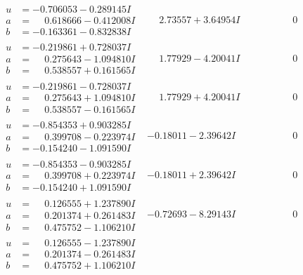 \documentclass[1p]{elsarticle_modified}
\theoremstyle{definition}
\begin{document}
$$\begin{array}{c|c|c}
\begin{aligned}
u &= -0.706053 - 0.289145 I \\
a &= \phantom{-}0.618666 - 0.412008 I \\
b &= -0.163361 - 0.832838 I\end{aligned}
 & \phantom{-}2.73557 + 3.64954 I & \phantom{-0.000000 } 0 \\ \hline\begin{aligned}
u &= -0.219861 + 0.728037 I \\
a &= \phantom{-}0.275643 - 1.094810 I \\
b &= \phantom{-}0.538557 + 0.161565 I\end{aligned}
 & \phantom{-}1.77929 - 4.20041 I & \phantom{-0.000000 } 0 \\ \hline\begin{aligned}
u &= -0.219861 - 0.728037 I \\
a &= \phantom{-}0.275643 + 1.094810 I \\
b &= \phantom{-}0.538557 - 0.161565 I\end{aligned}
 & \phantom{-}1.77929 + 4.20041 I & \phantom{-0.000000 } 0 \\ \hline\begin{aligned}
u &= -0.854353 + 0.903285 I \\
a &= \phantom{-}0.399708 - 0.223974 I \\
b &= -0.154240 - 1.091590 I\end{aligned}
 & -0.18011 - 2.39642 I & \phantom{-0.000000 } 0 \\ \hline\begin{aligned}
u &= -0.854353 - 0.903285 I \\
a &= \phantom{-}0.399708 + 0.223974 I \\
b &= -0.154240 + 1.091590 I\end{aligned}
 & -0.18011 + 2.39642 I & \phantom{-0.000000 } 0 \\ \hline\begin{aligned}
u &= \phantom{-}0.126555 + 1.237890 I \\
a &= \phantom{-}0.201374 + 0.261483 I \\
b &= \phantom{-}0.475752 - 1.106210 I\end{aligned}
 & -0.72693 - 8.29143 I & \phantom{-0.000000 } 0 \\ \hline\begin{aligned}
u &= \phantom{-}0.126555 - 1.237890 I \\
a &= \phantom{-}0.201374 - 0.261483 I \\
b &= \phantom{-}0.475752 + 1.106210 I\end{aligned}

\end{array}$$
\end{document}
